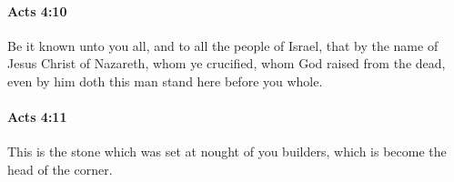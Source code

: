 		\paragraph{Acts 4:10} %
			\label{ACTS-4-10}

			Be it known unto you all, and to all the people of Israel, that by the name of Jesus Christ of Nazareth, whom ye crucified, whom God raised from the dead, even by him doth this man stand here before you whole.

			\begin{framed}
			\scriptsize
				\begin{compactdesc}
					\item[SBLG] 
				\end{compactdesc}
			\end{framed}

		\paragraph{Acts 4:11} %
			\label{ACTS-4-11}

			This is the stone which was set at nought of you builders, which is become the head of the corner.


